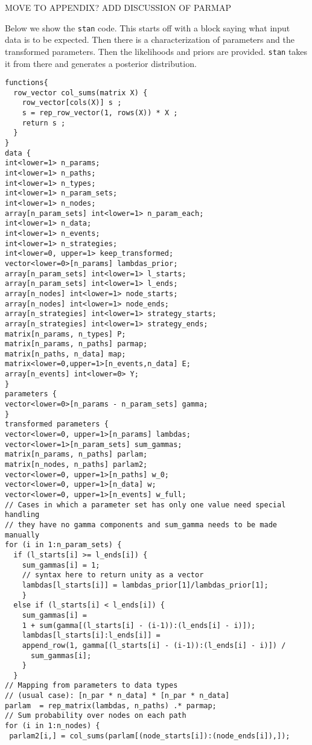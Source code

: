 \documentclass[
  11pt,
  article]{jss}
\begin{document}
MOVE TO APPENDIX? ADD DISCUSSION OF PARMAP

Below we show the \texttt{stan} code. This starts off with a block
saying what input data is to be expected. Then there is a
characterization of parameters and the transformed parameters. Then the
likelihoods and priors are provided. \texttt{stan} takes it from there
and generates a posterior distribution.

\begin{verbatim}
functions{
  row_vector col_sums(matrix X) {
    row_vector[cols(X)] s ;
    s = rep_row_vector(1, rows(X)) * X ;
    return s ;
  }
}
data {
int<lower=1> n_params;
int<lower=1> n_paths;
int<lower=1> n_types;
int<lower=1> n_param_sets;
int<lower=1> n_nodes;
array[n_param_sets] int<lower=1> n_param_each;
int<lower=1> n_data;
int<lower=1> n_events;
int<lower=1> n_strategies;
int<lower=0, upper=1> keep_transformed;
vector<lower=0>[n_params] lambdas_prior;
array[n_param_sets] int<lower=1> l_starts;
array[n_param_sets] int<lower=1> l_ends;
array[n_nodes] int<lower=1> node_starts;
array[n_nodes] int<lower=1> node_ends;
array[n_strategies] int<lower=1> strategy_starts;
array[n_strategies] int<lower=1> strategy_ends;
matrix[n_params, n_types] P;
matrix[n_params, n_paths] parmap;
matrix[n_paths, n_data] map;
matrix<lower=0,upper=1>[n_events,n_data] E;
array[n_events] int<lower=0> Y;
}
parameters {
vector<lower=0>[n_params - n_param_sets] gamma;
}
transformed parameters {
vector<lower=0, upper=1>[n_params] lambdas;
vector<lower=1>[n_param_sets] sum_gammas;
matrix[n_params, n_paths] parlam;
matrix[n_nodes, n_paths] parlam2;
vector<lower=0, upper=1>[n_paths] w_0;
vector<lower=0, upper=1>[n_data] w;
vector<lower=0, upper=1>[n_events] w_full;
// Cases in which a parameter set has only one value need special handling
// they have no gamma components and sum_gamma needs to be made manually
for (i in 1:n_param_sets) {
  if (l_starts[i] >= l_ends[i]) {
    sum_gammas[i] = 1;
    // syntax here to return unity as a vector
    lambdas[l_starts[i]] = lambdas_prior[1]/lambdas_prior[1];
    }
  else if (l_starts[i] < l_ends[i]) {
    sum_gammas[i] =
    1 + sum(gamma[(l_starts[i] - (i-1)):(l_ends[i] - i)]);
    lambdas[l_starts[i]:l_ends[i]] =
    append_row(1, gamma[(l_starts[i] - (i-1)):(l_ends[i] - i)]) /
      sum_gammas[i];
    }
  }
// Mapping from parameters to data types
// (usual case): [n_par * n_data] * [n_par * n_data]
parlam  = rep_matrix(lambdas, n_paths) .* parmap;
// Sum probability over nodes on each path
for (i in 1:n_nodes) {
 parlam2[i,] = col_sums(parlam[(node_starts[i]):(node_ends[i]),]);

\end{verbatim}
\end{document}
